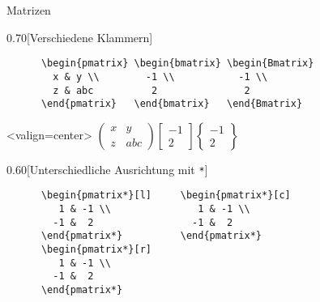 \begin{frame}[fragile]{
  Matrizen
  \hfill
}
  \fontsize{8}{0.8\baselineskip}\selectfont
  \begin{CodeExample}{0.70}[Verschiedene Klammern]
    \begin{lstlisting}
      \begin{pmatrix} \begin{bmatrix} \begin{Bmatrix}
        x & y \\        -1 \\           -1 \\
        z & abc          2               2
      \end{pmatrix}   \end{bmatrix}   \end{Bmatrix}
    \end{lstlisting}
  \CodeResult<valign=center>
    $\displaystyle
      \begin{pmatrix}
        x & y \\
        z & abc
      \end{pmatrix}
      \begin{bmatrix}
        -1 \\
         2
      \end{bmatrix}
      \begin{Bmatrix}
        -1 \\
         2
      \end{Bmatrix}
    $
  \end{CodeExample}
  \begin{CodeExample}{0.60}[Unterschiedliche Ausrichtung mit \lstinline+*+]
    \begin{lstlisting}
      \begin{pmatrix*}[l]     \begin{pmatrix*}[c]
         1 & -1 \\               1 & -1 \\
        -1 &  2                 -1 &  2
      \end{pmatrix*}          \end{pmatrix*}
      \begin{pmatrix*}[r]
         1 & -1 \\
        -1 &  2
      \end{pmatrix*}
    \end{lstlisting}
  \CodeResult
\end{CodeExample}
\end{frame}
